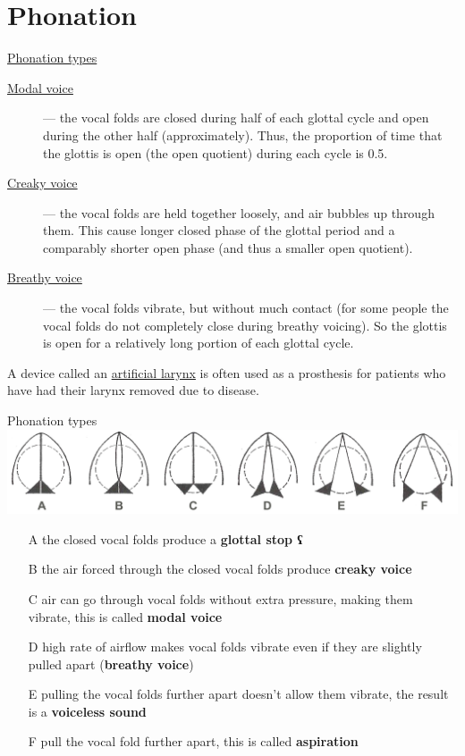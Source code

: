 \section{Phonation}
\begin{frame}{\href{https://www.youtube.com/watch?v=FG_iE0FdXRk}{Phonation types}}
\begin{description}
\item[\href{https://www.youtube.com/watch?v=v9Wdf-RwLcs}{Modal voice}] --- the vocal folds are closed during half of each glottal cycle and open during the other half (approximately). Thus, the proportion of time that the glottis is open (the open quotient) during each cycle is 0.5.
\item[\href{https://www.youtube.com/watch?v=BYSZS1LaABQ}{Creaky voice}] --- the vocal folds are held together loosely, and air bubbles up through them. This cause longer closed phase of the glottal period and a comparably shorter open phase (and thus a smaller open quotient).
\item[\href{https://www.youtube.com/watch?v=9cKnUFZjs8k}{Breathy voice}] --- the vocal folds vibrate, but without much contact (for some people the vocal folds do not completely close during breathy voicing). So the glottis is open for a relatively long portion of each glottal cycle.
\end{description}
A device called an \href{http://splab.net/APD/G100/G100_01.webm}{artificial larynx} is often used as a prosthesis for patients who have had their larynx removed due to disease.
\end{frame}

\begin{frame}{Phonation types}
\includegraphics[width=\linewidth]{01-glottis-positions.png}
\begin{itemize}
\item[A] the closed vocal folds produce a \textbf{glottal stop ʕ}
\item[B] the air forced through the closed vocal folds produce \textbf{creaky voice}
\item[C]  air can go through vocal folds without extra pressure, making them vibrate, this is called \textbf{modal voice}
\item[D] high rate of airflow makes vocal folds vibrate even if they are slightly pulled apart (\textbf{breathy voice})
\item[E]  pulling the vocal folds further apart doesn't allow them vibrate, the result is a \textbf{voiceless sound}
\item[F] pull the vocal fold further apart, this is called \textbf{aspiration}
\end{itemize}
\end{frame}

